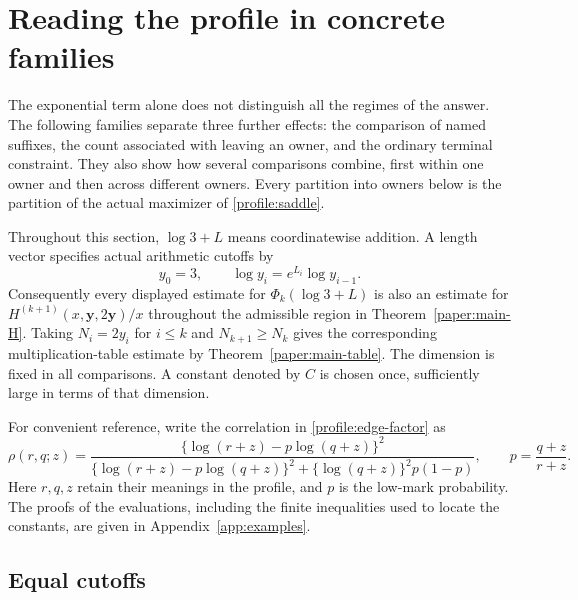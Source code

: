 \section{Reading the profile in concrete families}\label{sec:examples}

The exponential term alone does not distinguish all the regimes of the
answer.  The following families separate three further effects: the
comparison of named suffixes, the count associated with leaving an owner,
and the ordinary terminal constraint.  They also show how several
comparisons combine, first within one owner and then across different
owners.  Every partition into owners below is the partition of the actual
maximizer of \eqref{profile:saddle}.

Throughout this section, \(\log3+L\) means coordinatewise addition.  A
length vector specifies actual arithmetic cutoffs by
\[
 y_0=3,\qquad \log y_i=e^{L_i}\log y_{i-1}.
\]
Consequently every displayed estimate for \(\Phi_k(\log3+L)\) is also
an estimate for \(H^{(k+1)}(x,\mathbf y,2\mathbf y)/x\) throughout the
admissible region in Theorem~\ref{paper:main-H}.  Taking \(N_i=2y_i\)
for \(i\le k\) and \(N_{k+1}\ge N_k\) gives the corresponding
multiplication-table estimate by Theorem~\ref{paper:main-table}.
The dimension is fixed in all comparisons.  A constant denoted by \(C\)
is chosen once, sufficiently large in terms of that dimension.

For convenient reference, write the correlation in
\eqref{profile:edge-factor} as
\begin{equation}
 \rho(r,q;z)=
 \frac{\{\log(r+z)-p\log(q+z)\}^2}
 {\{\log(r+z)-p\log(q+z)\}^2+
             \{\log(q+z)\}^2p(1-p)},\qquad
 p=\frac{q+z}{r+z}.
 \label{ex:rho}
\end{equation}
Here \(r,q,z\) retain their meanings in the profile, and \(p\) is
the low-mark probability.  The proofs of the evaluations, including
the finite inequalities used to locate the constants, are given in
Appendix~\ref{app:examples}.

\subsection{Equal cutoffs}

